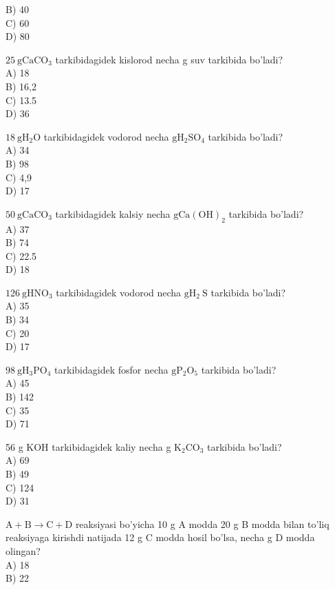 B) 40\\
C) 60\\
D) 80
  \item $25 \mathrm{~g} \mathrm{CaCO}_{3}$ tarkibidagidek kislorod necha g suv tarkibida bo'ladi?\\
A) 18\\
B) 16,2\\
C) 13.5\\
D) 36
  \item $18 \mathrm{~g} \mathrm{H}_{2} \mathrm{O}$ tarkibidagidek vodorod necha $\mathrm{g} \mathrm{H}_{2} \mathrm{SO}_{4}$ tarkibida bo'ladi?\\
A) 34\\
B) 98\\
C) 4,9\\
D) 17
  \item $50 \mathrm{~g} \mathrm{CaCO}_{3}$ tarkibidagidek kalsiy necha $\mathrm{g} \mathrm{Ca}(\mathrm{OH})_{2}$ tarkibida bo'ladi?\\
A) 37\\
B) 74\\
C) 22.5\\
D) 18
  \item $126 \mathrm{~g} \mathrm{HNO}_{3}$ tarkibidagidek vodorod necha $\mathrm{g} \mathrm{H}_{2} \mathrm{~S}$ tarkibida bo'ladi?\\
A) 35\\
B) 34\\
C) 20\\
D) 17
  \item $98 \mathrm{~g} \mathrm{H}_{3} \mathrm{PO}_{4}$ tarkibidagidek fosfor necha $\mathrm{g} \mathrm{P}_{2} \mathrm{O}_{5}$ tarkibida bo'ladi?\\
A) 45\\
B) 142\\
C) 35\\
D) 71
  \item 56 g KOH tarkibidagidek kaliy necha g $\mathrm{K}_{2} \mathrm{CO}_{3}$ tarkibida bo'ladi?\\
A) 69\\
B) 49\\
C) 124\\
D) 31
  \item $\mathrm{A}+\mathrm{B} \rightarrow \mathrm{C}+\mathrm{D}$ reaksiyasi bo'yicha 10 g A modda 20 g B modda bilan to'liq reaksiyaga kirishdi natijada 12 g C modda hosil bo'lsa, necha g D modda olingan?\\
A) 18\\
B) 22\\
